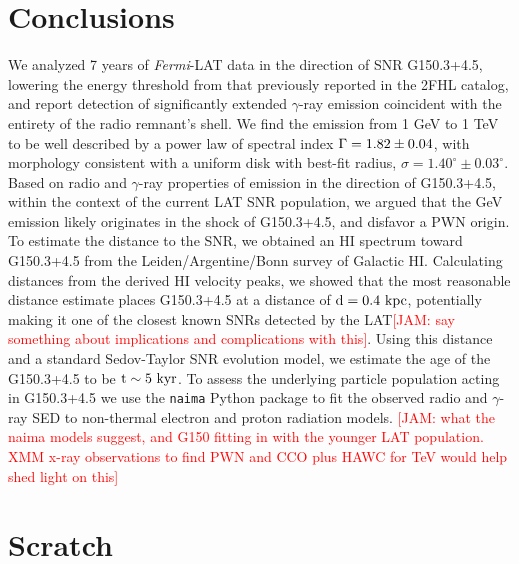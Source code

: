 \documentclass[iop]{emulateapj}
\newcommand{\kibitz}[2]{\ifnum\Comments=1\textcolor{#1}{#2}\fi}
\newcommand{\jamie}[1]{\kibitz{red}      {[JAM: #1]}}
\newcommand{\gam}{$\gamma$-ray}
\newcommand{\FermiLat}{\emph{Fermi}-LAT }     %
\newcommand{\nai}{{\tt naima}}
\newcommand{\Gone}{G150.3+4.5}
\begin{document}
%
%
\section{Conclusions}\label{G150:Conc}
We analyzed 7 years of \FermiLat{} data in the direction of SNR \Gone{}, lowering the energy threshold from that previously reported in the 2FHL catalog, and report detection of significantly extended \gam{} emission coincident with the entirety of the radio remnant's shell. We find the emission from 1 GeV to 1 TeV to be well described by a power law of spectral index ${\Gamma = \rm 1.82 \pm 0.04}$, with  morphology consistent with a uniform disk with best-fit radius, {\rm $\sigma = 1.40^{\circ} \pm 0.03^{\circ}$}.  Based on radio and  \gam{} properties of emission in the direction of \Gone{}, within the context of the current LAT SNR population, we argued that the GeV emission likely originates in the shock of \Gone{}, and disfavor a PWN origin. To estimate the distance to the SNR, we obtained  an HI spectrum toward \Gone{} from the Leiden/Argentine/Bonn survey of Galactic HI. Calculating distances from the derived HI velocity peaks, we showed that the most reasonable distance estimate places \Gone{} at a distance of ${\rm d = 0.4~kpc}$, potentially making it one of the closest known SNRs detected by the LAT\jamie{say something about implications and complications with this}. Using this distance and a standard Sedov-Taylor SNR evolution model, we estimate the age of the \Gone{} to be ${\rm t \sim 5~kyr}$. %
To assess the underlying particle population acting in \Gone{} we use the \nai{} Python package to fit the observed radio and \gam{} SED to non-thermal electron and proton radiation models. \jamie{what the naima models suggest, and G150 fitting in with the younger LAT population. XMM x-ray observations to find PWN and CCO plus HAWC for TeV would help shed light on this} %


\section{Scratch}
\end{document}
